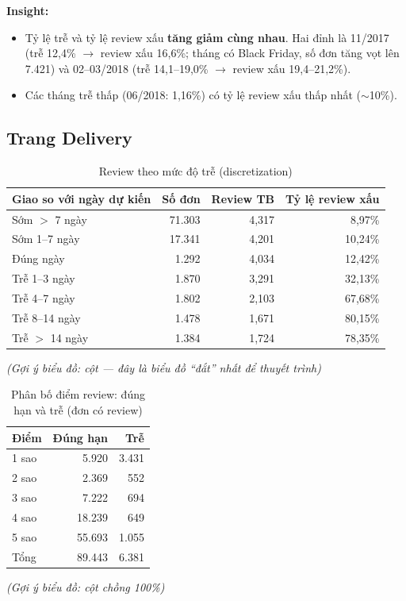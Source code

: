\documentclass[12pt,a4paper]{report}
\newcommand{\bieudo}[1]{\par{\small\textit{(Gợi ý biểu đồ: #1)}}\par}
\renewcommand{\_}{\oldunderscore\allowbreak}
\begin{document}
\textbf{Insight:}
\begin{itemize}
\item Tỷ lệ trễ và tỷ lệ review xấu \textbf{tăng giảm cùng nhau}. Hai đỉnh là 11/2017 (trễ 12,4\% $\rightarrow$ review xấu 16,6\%; tháng có Black Friday, số đơn tăng vọt lên 7.421) và 02--03/2018 (trễ 14,1--19,0\% $\rightarrow$ review xấu 19,4--21,2\%).
\item Các tháng trễ thấp (06/2018: 1,16\%) có tỷ lệ review xấu thấp nhất ($\sim$10\%).
\end{itemize}

\subsection{Trang Delivery}

\begin{table}[H]
\centering\small
\caption{Review theo mức độ trễ (discretization)}
\begin{tabular}{lrrr}
\toprule
Giao so với ngày dự kiến & Số đơn & Review TB & Tỷ lệ review xấu \\
\midrule
Sớm $>$ 7 ngày & 71.303 & 4,317 & 8,97\% \\
Sớm 1--7 ngày & 17.341 & 4,201 & 10,24\% \\
Đúng ngày & 1.292 & 4,034 & 12,42\% \\
Trễ 1--3 ngày & 1.870 & 3,291 & 32,13\% \\
Trễ 4--7 ngày & 1.802 & 2,103 & 67,68\% \\
Trễ 8--14 ngày & 1.478 & 1,671 & 80,15\% \\
Trễ $>$ 14 ngày & 1.384 & 1,724 & 78,35\% \\
\bottomrule
\end{tabular}
\end{table}
\bieudo{cột --- đây là biểu đồ ``đắt'' nhất để thuyết trình}

\begin{table}[H]
\centering\small
\caption{Phân bố điểm review: đúng hạn và trễ (đơn có review)}
\begin{tabular}{lrr}
\toprule
Điểm & Đúng hạn & Trễ \\
\midrule
1 sao & 5.920 & 3.431 \\
2 sao & 2.369 & 552 \\
3 sao & 7.222 & 694 \\
4 sao & 18.239 & 649 \\
5 sao & 55.693 & 1.055 \\
\midrule
Tổng & 89.443 & 6.381 \\
\bottomrule
\end{tabular}
\end{table}
\bieudo{cột chồng 100\%}
\end{document}

